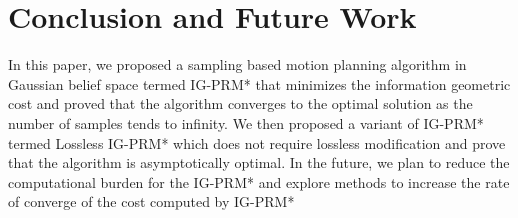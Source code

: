 \documentclass[Afour,sageh,times]{sagej}
\def\volumeyear{2016}
\begin{document}
\section{Conclusion and Future Work}
 In this paper, we proposed a sampling based motion planning algorithm in Gaussian belief space termed IG-PRM* that minimizes the information geometric cost and proved that the algorithm converges to the optimal solution as the number of samples tends to infinity. We then proposed a variant of IG-PRM* termed Lossless IG-PRM* which does not require lossless modification and prove that the algorithm is asymptotically optimal. In the future, we plan to reduce the computational burden for the IG-PRM* and explore methods to increase the rate of converge of the cost computed by IG-PRM* 
\label{sec:conclusion}









%



\end{document}
